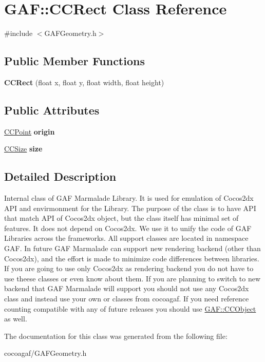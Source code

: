\hypertarget{class_g_a_f_1_1_c_c_rect}{\section{G\-A\-F\-:\-:C\-C\-Rect Class Reference}
\label{class_g_a_f_1_1_c_c_rect}
}


{\ttfamily \#include $<$G\-A\-F\-Geometry.\-h$>$}

\subsection*{Public Member Functions}
\begin{DoxyCompactItemize}
\item 
\hypertarget{class_g_a_f_1_1_c_c_rect_ac98d154bec883ca32305aeedf240395d}{{\bfseries C\-C\-Rect} (float x, float y, float width, float height)}\label{class_g_a_f_1_1_c_c_rect_ac98d154bec883ca32305aeedf240395d}

\end{DoxyCompactItemize}
\subsection*{Public Attributes}
\begin{DoxyCompactItemize}
\item 
\hypertarget{class_g_a_f_1_1_c_c_rect_ab4e03f6d8228bd9078c5c42670f7f020}{\hyperlink{class_g_a_f_1_1_c_c_point}{C\-C\-Point} {\bfseries origin}}\label{class_g_a_f_1_1_c_c_rect_ab4e03f6d8228bd9078c5c42670f7f020}

\item 
\hypertarget{class_g_a_f_1_1_c_c_rect_a6a766309814b1a2970f86ea3952a7587}{\hyperlink{class_g_a_f_1_1_c_c_size}{C\-C\-Size} {\bfseries size}}\label{class_g_a_f_1_1_c_c_rect_a6a766309814b1a2970f86ea3952a7587}

\end{DoxyCompactItemize}


\subsection{Detailed Description}
Internal class of G\-A\-F Marmalade Library. It is used for emulation of Cocos2dx A\-P\-I and envirmonment for the Library. The purpose of the class is to have A\-P\-I that match A\-P\-I of Cocos2dx object, but the class itself has minimal set of features. It does not depend on Cocos2dx. We use it to unify the code of G\-A\-F Libraries across the frameworks. All support classes are located in namespace G\-A\-F. In future G\-A\-F Marmalade can support new rendering backend (other than Cocos2dx), and the effort is made to minimize code differences between libraries. If you are going to use only Cocos2dx as rendering backend you do not have to use theese classes or even know about them. If you are planning to switch to new backend that G\-A\-F Marmalade will support you should not use any Cocos2dx class and instead use your own or classes from cocoagaf. If you need reference counting compatible with any of future releases you should use \hyperlink{class_g_a_f_1_1_c_c_object}{G\-A\-F\-::\-C\-C\-Object} as well. 

The documentation for this class was generated from the following file\-:\begin{DoxyCompactItemize}
\item 
cocoagaf/G\-A\-F\-Geometry.\-h\end{DoxyCompactItemize}
